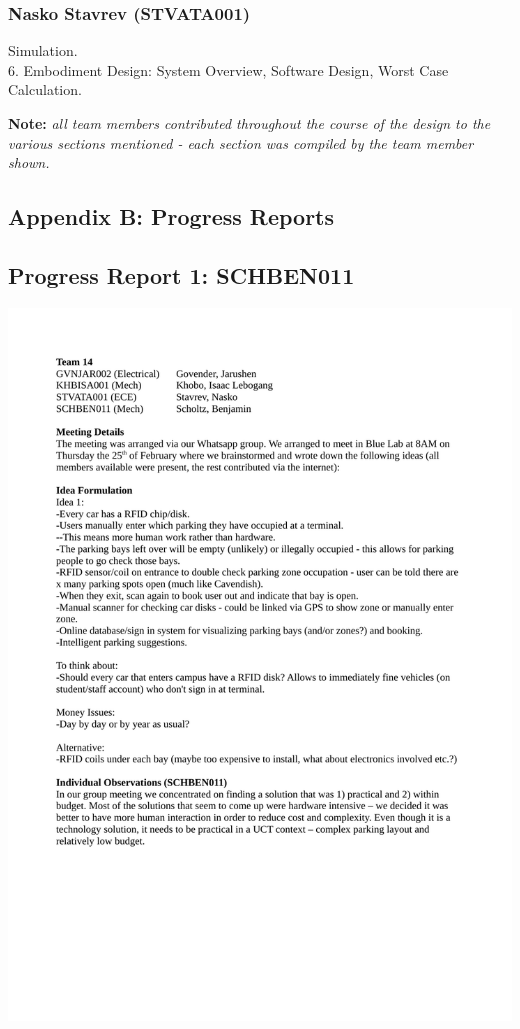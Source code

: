 \subsubsection*{Nasko Stavrev (STVATA001)}
Simulation.\\
6. Embodiment Design: System Overview, Software Design, Worst Case Calculation.

\vfill
\textbf{Note: }\textit{all team members contributed throughout the course of the design to the various sections mentioned - each section was compiled by the team member shown.}

\newpage
\vspace*{\fill}
\begin{center}
\subsection*{Appendix B: Progress Reports}
\end{center}
\vspace*{\fill}

\newpage
\subsection*{Progress Report 1: SCHBEN011}
\includegraphics[scale=0.9]{meeting/report1-ben.pdf}

